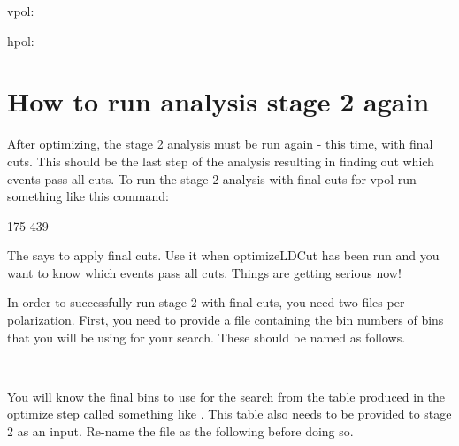 \begin{center}
\gls{vpol}:
    
\end{center}

\begin{center}
\gls{hpol}:
    
\end{center}


\section{How to run analysis stage 2 again}

After optimizing, the stage 2 analysis must be run again - this time, with final cuts. This should be the last step of the analysis resulting in finding out which events pass all cuts. To run the stage 2 analysis with final cuts for \gls{vpol} run something like this command: 

\begin{center}
    175 439    
\end{center}

The  says to apply final cuts.  
Use it when optimizeLDCut has been run and you want to know which events pass all cuts. Things are getting serious now!

In order to successfully run stage 2 with final cuts, you need two files per polarization. First, you need to provide a file containing the bin numbers of bins that you will be using for your search. These should be named as follows. 

\begin{center}
\\
\end{center}

You will know the final bins to use for the search from the table produced in the optimize step called something like . This table also needs to be provided to stage 2 as an input. Re-name the  file as the following before doing so. 

